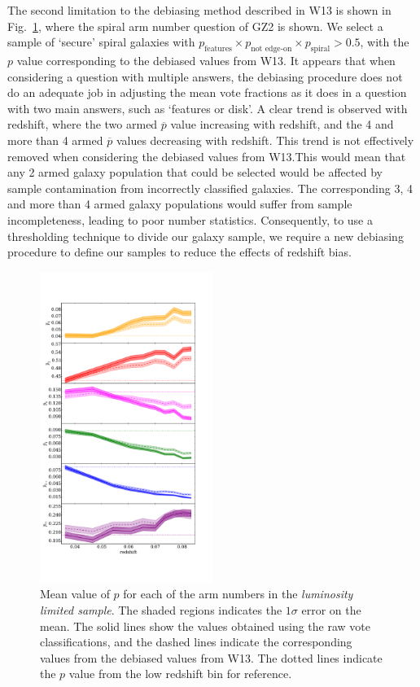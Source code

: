 \documentclass[useAMS,usenatbib]{mn2e}
\begin{document}
The second limitation to the debiasing method described in W13 is shown in Fig.~\ref{fig:arm_bias}, where the spiral arm number question of GZ2 is shown. We select a sample of `secure' spiral galaxies with $p_{\textrm{features}} \times p_{\textrm{not edge-on}} \times p_{\textrm{spiral}} > 0.5$, with the $p$ value corresponding to the debiased values from W13. It appears that when considering a question with multiple answers, the debiasing procedure does not do an adequate job in adjusting the mean vote fractions as it does in a question with two main answers, such as `features or disk'. A clear trend is observed with redshift, where the two armed $\overline{p}$ value increasing with redshift, and the 4 and more than 4 armed $\overline{p}$ values decreasing with redshift. This trend is not effectively removed when considering the debiased values from W13.This would mean that any 2 armed galaxy population that could be selected would be affected by sample contamination from incorrectly classified galaxies. The corresponding 3, 4 and more than 4 armed galaxy populations would suffer from sample incompleteness, leading to poor number statistics. Consequently, to use a thresholding technique to divide our galaxy sample, we require a new debiasing procedure to define our samples to reduce the effects of redshift bias.

\begin{figure}
		\centering

        \includegraphics[width=0.5\textwidth]{Data_imgs/arm_bias.pdf}

        \caption{Mean value of $p$ for each of the arm numbers in the \textit{luminosity limited sample}. The shaded regions indicates the $1 \sigma$ error on the mean. The solid lines show the values obtained using the raw vote classifications, and the dashed lines indicate the corresponding values from the debiased values from W13. The dotted lines indicate the $p$ value from the low redshift bin for reference.}

        \label{fig:arm_bias}

\end{figure}
\end{document}
